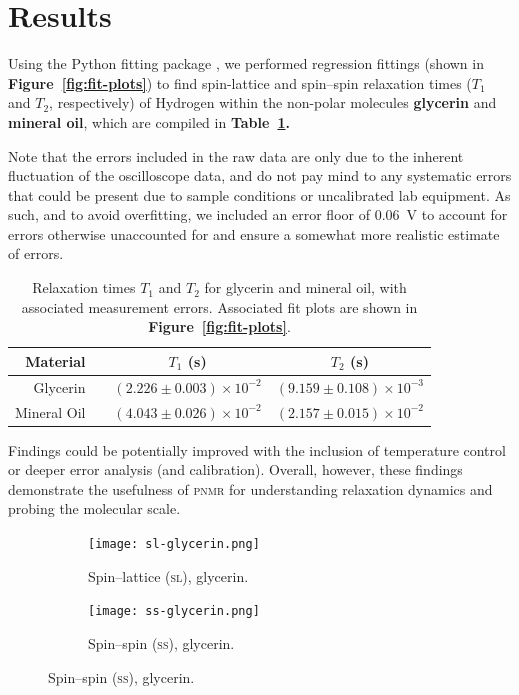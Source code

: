 \documentclass[12pt]{report}
\begin{document}
\section*{Results}
{
    Using the Python fitting package , we performed regression fittings (shown in \textbf{Figure~\ref{fig:fit-plots}}) to find spin-lattice and spin–spin relaxation times ($T_1$ and $T_2$, respectively) of Hydrogen within the non-polar molecules \textbf{glycerin} and \textbf{mineral oil}, which are compiled in \textbf{Table\ \ref{tab:relaxation-times}.} 
    
    Note that the errors included in the raw data are only due to the inherent fluctuation of the oscilloscope data, and do not pay mind to any systematic errors that could be present due to sample conditions or uncalibrated lab equipment. As such, and to avoid overfitting, we included an error floor of \SI{0.06}{\volt} to account for errors otherwise unaccounted for and ensure a somewhat more realistic estimate of errors.
    
    \begin{table}[tbh]
        \centering
        \begin{tabular}{rccc}
             \textbf{Material}   && $T_1$ (s) & $T_2$ (s) \\ \hline
            Glycerin    && $(2.226 \pm 0.003) \times 10^{-2}$ & $(9.159 \pm 0.108) \times 10^{-3}$ \\
            Mineral Oil && $(4.043 \pm 0.026) \times 10^{-2}$ & $(2.157 \pm 0.015) \times 10^{-2}$ \\
        \end{tabular}
        \caption{Relaxation times $T_1$ and $T_2$ for glycerin and mineral oil, with associated measurement errors. Associated fit plots are shown in \textbf{Figure~\ref{fig:fit-plots}}.}
        \label{tab:relaxation-times}
    \end{table}

    Findings could be potentially improved with the inclusion of temperature control or deeper error analysis (and calibration). Overall, however, these findings demonstrate the usefulness of \textsc{pnmr} for understanding relaxation dynamics and probing the molecular scale. 
    
    \begin{figure}[tbh]
        \centering
        \begin{subfigure}{0.45\textwidth}
            \centering
            \texttt{[image: sl-glycerin.png]}
            \caption{Spin–lattice (\textsc{sl}), glycerin.}
            \label{fig:sl-glycerin}
        \end{subfigure}
        \hspace{0.02\textwidth} %
        \begin{subfigure}{0.45\textwidth}
            \centering
            \texttt{[image: ss-glycerin.png]}
            \caption{Spin–spin (\textsc{ss}), glycerin.}
            \label{fig:ss-glycerin}
        \end{subfigure}
        

\end{figure}}
\end{document}
